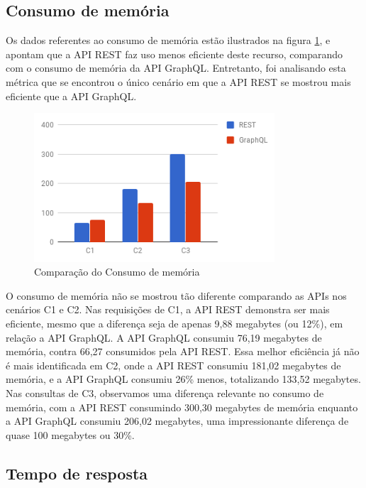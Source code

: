 \subsection{Consumo de memória}

Os dados referentes ao consumo de memória estão ilustrados na figura \ref{fig:q2-mem}, e apontam que a API REST faz uso menos eficiente deste recurso, comparando com o consumo de memória da API GraphQL. Entretanto, foi analisando esta métrica que se encontrou o único cenário em que a API REST se mostrou mais eficiente que a API GraphQL.

\begin{figure}[htbp]
    \centering
    \includegraphics[width=0.8\textwidth]{figuras/q2-memory.png}
    \caption{Comparação do Consumo de memória}
    \label{fig:q2-mem}
    \author{fonte: Autor}
\end{figure}

O consumo de memória não se mostrou tão diferente comparando as APIs nos cenários C1 e C2. Nas requisições de C1, a API REST demonstra ser mais eficiente, mesmo que a diferença seja de apenas 9,88 megabytes (ou 12\%), em relação a API GraphQL. A API GraphQL consumiu 76,19 megabytes de memória, contra 66,27 consumidos pela API REST. Essa melhor eficiência já não é mais identificada em C2, onde a API REST consumiu 181,02 megabytes de memória, e a API GraphQL consumiu 26\% menos, totalizando 133,52 megabytes. Nas consultas de C3, observamos uma diferença relevante no consumo de memória, com a API REST consumindo 300,30 megabytes de memória enquanto a API GraphQL consumiu 206,02 megabytes, uma impressionante diferença de quase 100 megabytes ou 30\%.

\subsection{Tempo de resposta}

